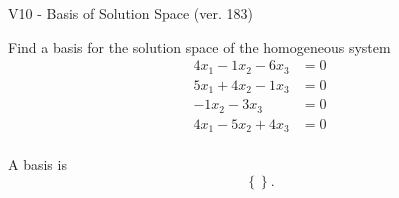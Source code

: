 \begin{exercise}
  \begin{exerciseTitle}V10 - Basis of Solution Space (ver. 183)\end{exerciseTitle}
  \begin{exerciseStatement}
    Find a basis for the solution space of the homogeneous system 
\begin{align*}
 4 x_ 1 -1 x_ 2 -6 x_ 3 &= 0  \\ 
  5 x_ 1 + 4 x_ 2 -1 x_ 3 &= 0  \\ 
  -1 x_ 2 -3 x_ 3 &= 0  \\ 
  4 x_ 1 -5 x_ 2 + 4 x_ 3 &= 0  \\ 
 \end{align*}


 
  \end{exerciseStatement}

  \begin{exerciseAnswer}
   A basis is   
\[\left\{\right\}.\]

  


  \end{exerciseAnswer}
\end{exercise}